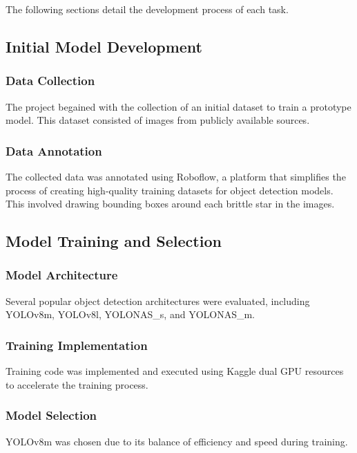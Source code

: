 \documentclass{article}
\begin{document}
    The following sections detail the development process of each task.
\subsection{Initial Model Development}

\subsubsection{Data Collection}

The project begained with the collection of an initial dataset to train a prototype model. This dataset consisted of images from publicly available sources.

\subsubsection{Data Annotation}

The collected data was annotated using Roboflow, a platform that simplifies the process of creating high-quality training datasets for object detection models. This involved drawing bounding boxes around each brittle star in the images.

\subsection{Model Training and Selection}

\subsubsection{Model Architecture}

Several popular object detection architectures were evaluated, including YOLOv8m, YOLOv8l, YOLONAS\_s, and YOLONAS\_m.

\subsubsection{Training Implementation}

Training code was implemented and executed using Kaggle dual GPU resources to accelerate the training process.

\subsubsection{Model Selection}

YOLOv8m was chosen due to its balance of efficiency and speed during training.
\end{document}
